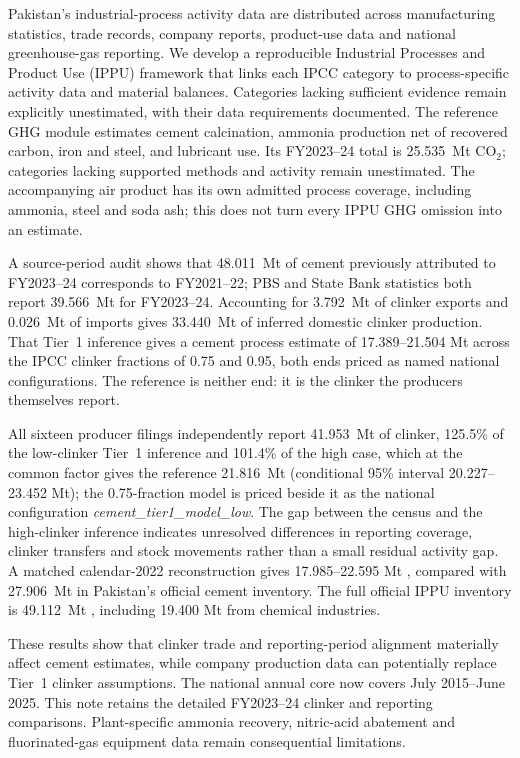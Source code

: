 Pakistan's industrial-process activity data are distributed across manufacturing statistics,
trade records, company reports, product-use data and national greenhouse-gas reporting. We
develop a reproducible Industrial Processes and Product Use (IPPU) framework that links each
IPCC category to process-specific activity data and material balances. Categories lacking
sufficient evidence remain explicitly unestimated, with their data requirements documented.
The reference GHG module estimates cement calcination, ammonia production net of recovered carbon, iron and steel, and lubricant use. Its FY2023--24 total is \SI{25.535}{\mega\tonne} CO$_2$; categories lacking supported methods and activity remain unestimated. The accompanying air product has its own admitted process coverage, including ammonia, steel and soda ash; this does not turn every IPPU GHG omission into an estimate.

A source-period audit shows that \SI{48.011}{\mega\tonne} of cement previously attributed to
FY2023--24 corresponds to FY2021--22; PBS and State Bank statistics both report
\SI{39.566}{\mega\tonne} for FY2023--24. Accounting for \SI{3.792}{\mega\tonne} of
clinker exports and \SI{0.026}{\mega\tonne} of imports gives
\SI{33.440}{\mega\tonne} of inferred domestic clinker production. That Tier~1 inference
gives a cement process estimate of 17.389--21.504 Mt \COtwo{} across the IPCC
clinker fractions of 0.75 and 0.95, both ends priced as named national configurations.
The reference is neither end: it is the clinker the producers themselves report.

All sixteen producer filings independently report \SI{41.953}{\mega\tonne} of clinker,
125.5\% of the low-clinker Tier~1 inference and 101.4\% of the high case, which at the
common factor gives the reference \SI{21.816}{\mega\tonne} \COtwo{} (conditional 95\%
interval 20.227--23.452 Mt); the 0.75-fraction model is priced beside it as the national
configuration \emph{cement\_tier1\_model\_low}. The gap between the census and the
high-clinker inference indicates unresolved differences in reporting coverage, clinker
transfers and stock movements rather than a small residual activity gap. A matched calendar-2022
reconstruction gives 17.985--22.595 Mt \COtwo{}, compared with
\SI{27.906}{\mega\tonne} in Pakistan's official cement inventory. The full official IPPU
inventory is \SI{49.112}{\mega\tonne} \COe{}, including 19.400 Mt from chemical
industries.

These results show that clinker trade and reporting-period alignment materially affect cement
estimates, while company production data can potentially replace Tier~1 clinker assumptions.
The national annual core now covers July 2015--June 2025. This note retains the detailed FY2023--24 clinker and reporting comparisons. Plant-specific ammonia recovery, nitric-acid abatement and fluorinated-gas equipment data remain consequential limitations.
